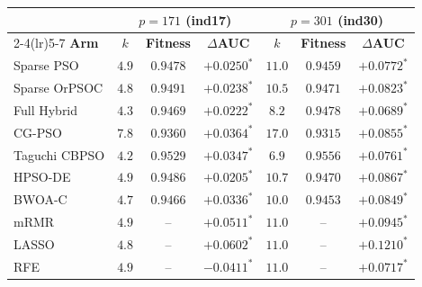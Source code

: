 \begin{table}[htbp]
    \centering
    \small\setlength{\tabcolsep}{4pt}
    \begin{tabular}{lcccccc}
        \toprule
        & \multicolumn{3}{c}{$p = 171$ (ind17)} & \multicolumn{3}{c}{$p = 301$ (ind30)} \\
        \cmidrule(lr){2-4}\cmidrule(lr){5-7}
        \textbf{Arm} & $k$ & \textbf{Fitness} & $\Delta$\textbf{AUC} & $k$ & \textbf{Fitness} & $\Delta$\textbf{AUC} \\
        \midrule
        Sparse PSO & $4.9$ & $0.9478$ & $\mathbf{+0.0250}^{*}$ & $11.0$ & $0.9459$ & $\mathbf{+0.0772}^{*}$ \\
        Sparse OrPSOC & $4.8$ & $0.9491$ & $\mathbf{+0.0238}^{*}$ & $10.5$ & $0.9471$ & $\mathbf{+0.0823}^{*}$ \\
        Full Hybrid & $4.3$ & $0.9469$ & $\mathbf{+0.0222}^{*}$ & $8.2$ & $0.9478$ & $\mathbf{+0.0689}^{*}$ \\
        CG-PSO & $7.8$ & $0.9360$ & $\mathbf{+0.0364}^{*}$ & $17.0$ & $0.9315$ & $\mathbf{+0.0855}^{*}$ \\
        Taguchi CBPSO & $4.2$ & $\mathbf{0.9529}$ & $\mathbf{+0.0347}^{*}$ & $6.9$ & $\mathbf{0.9556}$ & $\mathbf{+0.0761}^{*}$ \\
        HPSO-DE & $4.9$ & $0.9486$ & $\mathbf{+0.0205}^{*}$ & $10.7$ & $0.9470$ & $\mathbf{+0.0867}^{*}$ \\
        BWOA-C & $4.7$ & $0.9466$ & $\mathbf{+0.0336}^{*}$ & $10.0$ & $0.9453$ & $\mathbf{+0.0849}^{*}$ \\
        \midrule
        mRMR & $4.9$ & -- & $\mathbf{+0.0511}^{*}$ & $11.0$ & -- & $\mathbf{+0.0945}^{*}$ \\
        LASSO & $4.8$ & -- & $\mathbf{+0.0602}^{*}$ & $11.0$ & -- & $\mathbf{+0.1210}^{*}$ \\
        RFE & $4.9$ & -- & $-0.0411^{*}$ & $11.0$ & -- & $\mathbf{+0.0717}^{*}$ \\
        \bottomrule
    \end{tabular}

\end{table}
